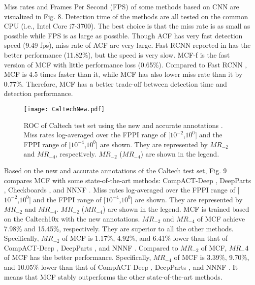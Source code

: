 \documentclass[journal]{IEEEtran}
\begin{document}
Miss rates and Frames Per Second (FPS) of some methods based on CNN are visualized in Fig. 8. Detection time of the methods are all tested on the common CPU (i.e., Intel Core i7-3700). The best choice is that the miss rate is as small as possible while FPS is as large as possible. Though ACF \cite{Dollar_ACF_PAMI_2014} has very fast detection speed (9.49 fps), miss rate of ACF are very large. Fast RCNN reported in \cite{Li_ScaleAware_arXiv_2015} has the better performance (11.82\%), but the speed is very slow. MCF-f is the fast version of MCF with little performance loss (0.65\%). Compared to Fast RCNN \cite{Li_ScaleAware_arXiv_2015}, MCF is 4.5 times faster than it, while MCF has also lower miss rate than it by 0.77\%. Therefore, MCF has a better trade-off between detection time and detection performance.

\begin{figure}[!t]
\label{CaltechNew}
\centering
\texttt{[image: CaltechNew.pdf]}
\caption{ROC of Caltech test set using the new and accurate annotations \cite{Zhang_RotatedFilters_arXiv_2016}. Miss rates log-averaged over the FPPI range of [$10^{-2}$,$10^0$] and the FPPI range of [$10^{-4}$,$10^0$] are shown. They are represented by $MR_{-2}$ and $MR_{-4}$, respectively. $MR_{-2}$ ($MR_{-4}$) are shown in the legend.} 
\end{figure}

Based on the new and accurate annotations of the Caltech test set, Fig. 9 compares MCF with some state-of-the-art methods: CompACT-Deep \cite{Cai_CompACT_ICCV_2015}, DeepParts \cite{Tian_DeepParts_ICCV_2015}, Checkboards \cite{Zhang_FCF_CVPR_2015}, and NNNF \cite{Cao_NNNF_arXiv_2015}. Miss rates log-averaged over the FPPI range of [$10^{-2}$,$10^0$] and the FPPI range of [$10^{-4}$,$10^0$] are shown. They are represented by $MR_{-2}$ and $MR_{-4}$. $MR_{-2}$ ($MR_{-4}$) are shown in the legend. MCF is trained based on the Caltech10x with the new annotations. $MR_{-2}$ and $MR_{-4}$ of MCF achieve 7.98\% and 15.45\%, respectively. They are superior to all the other methods. Specifically, $MR_{-2}$ of MCF is 1.17\%, 4.92\%, and 6.41\% lower than that of CompACT-Deep \cite{Cai_CompACT_ICCV_2015}, DeepParts \cite{Tian_DeepParts_ICCV_2015}, and NNNF \cite{Cao_NNNF_arXiv_2015}. Compared to $MR_{-2}$ of MCF, $MR_-4$ of MCF has the better performance. Specifically, $MR_{-4}$ of MCF is 3.39\%, 9.70\%, and 10.05\% lower than that of CompACT-Deep \cite{Cai_CompACT_ICCV_2015}, DeepParts \cite{Tian_DeepParts_ICCV_2015}, and NNNF \cite{Cao_NNNF_arXiv_2015}. It means that MCF stably outperforms the other state-of-the-art methods.
\end{document}
